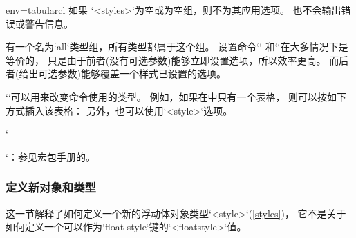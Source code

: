\begin{tableobject}{env=tabular}{cl}
如果 `<styles>`为空或为空组，则不为其应用选项。
也不会输出错误或警告信息。

有一个名为`all`类型组，所有类型都属于这个组。
设置命令`` 和``在大多情况下是等价的，
只是由于前者(没有可选参数)能够立即设置选项，所以效率更高。
而后者(给出可选参数)能够覆盖一个样式已设置的选项。

\DescribeMacro{\graphicobjectstyle}
``可以用来改变命令使用的类型。
例如，如果在中只有一个表格，
则可以按如下方式插入该表格：
另外，也可以使用`<style>`选项。


\begin{examplecode}
\begingroup
{}
\endgroup
\end{examplecode}


\DescribeMacro{\graphicspath}
`\graphicspath{{path/}}`：参见宏包手册的\autocite[4.5小节]{graphicx}。


\subsubsection{定义新对象和类型}
\label{new-object-styles-and-types}

这一节解释了如何定义一个新的浮动体对象类型`<style>`(\cref{styles})，
它不是关于如何定义一个可以作为`float style`键的`<floatstyle>`值。


\end{tableobject}
